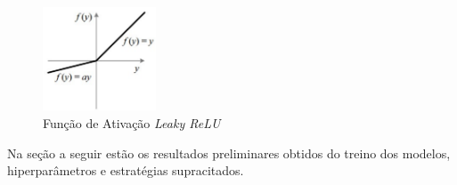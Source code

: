 \begin{figure}[h!]
     \centering
     \includegraphics[width=0.3\textwidth]{img/lrelu}
     \caption{Função de Ativação \emph{Leaky ReLU}}
     \label{fig:lrelu}
\end{figure}

Na seção a seguir estão os resultados preliminares obtidos do treino dos modelos, hiperparâmetros e estratégias supracitados.
